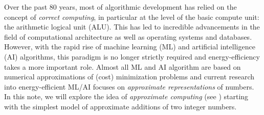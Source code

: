 Over the past 80 years, most of algorithmic development has relied on the concept of {\em correct computing}, in particular at the level of the basic compute unit: the arithmetic logical unit (ALU). This has led to incredible advancements in the field of computational architecture as well as operating systems and databases. However, with the rapid rise of machine learning (ML) and artificial intelligence (AI) algorithms, this paradigm is no longer strictly required and energy-efficiency takes a more important role. Almost all ML and AI algorithm are based on numerical approximations of (cost) minimization problems and current research into energy-efficient ML/AI focuses on {\em approximate representations} of numbers. In this note, we will explore the idea of {\em approximate computing} (see \cite{XuMytKim2022a}) starting with the simplest model of approximate additions of two integer numbers.
